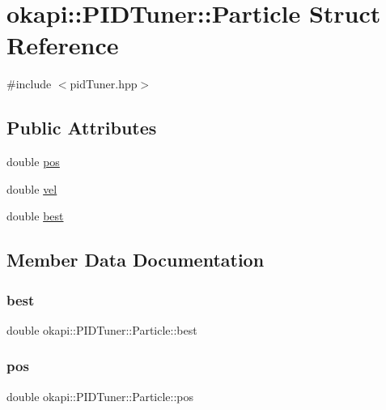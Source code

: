 \hypertarget{structokapi_1_1PIDTuner_1_1Particle}{}\section{okapi\+::P\+I\+D\+Tuner\+::Particle Struct Reference}
\label{structokapi_1_1PIDTuner_1_1Particle}


{\ttfamily \#include $<$pid\+Tuner.\+hpp$>$}

\subsection*{Public Attributes}
\begin{DoxyCompactItemize}
\item 
double \mbox{\hyperlink{structokapi_1_1PIDTuner_1_1Particle_a59ef510201da8dc860a803c202044b2d}{pos}}
\item 
double \mbox{\hyperlink{structokapi_1_1PIDTuner_1_1Particle_a16dc34bf86fd5c57182d513a597249c8}{vel}}
\item 
double \mbox{\hyperlink{structokapi_1_1PIDTuner_1_1Particle_a5b52868df1aae1367f6ec138e2494e09}{best}}
\end{DoxyCompactItemize}


\subsection{Member Data Documentation}
\mbox{\label{structokapi_1_1PIDTuner_1_1Particle_a5b52868df1aae1367f6ec138e2494e09}} 
\subsubsection{\texorpdfstring{best}{best}}
{\footnotesize\ttfamily double okapi\+::\+P\+I\+D\+Tuner\+::\+Particle\+::best}

\mbox{\label{structokapi_1_1PIDTuner_1_1Particle_a59ef510201da8dc860a803c202044b2d}} 
\subsubsection{\texorpdfstring{pos}{pos}}
{\footnotesize\ttfamily double okapi\+::\+P\+I\+D\+Tuner\+::\+Particle\+::pos}

